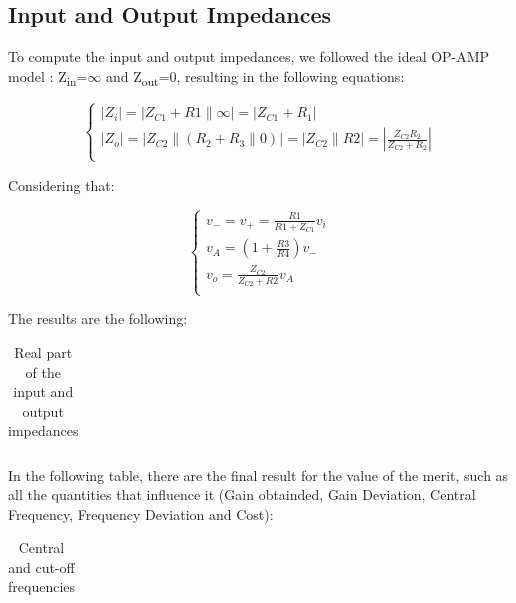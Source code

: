 \subsection{Input and Output Impedances}

To compute the input and output impedances, we followed the ideal OP-AMP model : Z\textsubscript{in}=$\infty$ and Z\textsubscript{out}=0, resulting in the following equations:

\begin{equation}\label{impedances}
\begin{cases}
  |Z_i| = |Z_{C1} + R1 \parallel \infty| = |Z_{C1} + R_1|\\
  |Z_o| = |Z_{C2} \parallel (R_2 + R_3 \parallel 0)| = |Z_{C2} \parallel R2| 
  = |\frac{Z_{C2}R_2}{Z_{C2}+R_2}|\\
 \end{cases}
\end{equation}


 Considering that:
 
 \begin{equation}
 \begin{cases}
    v_- = v_+ = \frac{R1}{R1+Z_{C1}} v_i\\
    v_A = \left(1 + \frac{R3}{R4}\right) v_-\\
    v_o = \frac{Z_{C2}}{Z_{C2}+R2} v_A\\
  \end{cases}
 \end{equation}
 
 
The results are the following:

\begin{table}[!htb]
\centering
  \begin{tabular}{|c|c|}
    \hline    
    
 \end{tabular}
 \caption{Real part of the input and output impedances}\label{tab:theo:impedances}
\end{table}

In the following table, there are the final result for the value of the merit, such as all the quantities that influence it (Gain obtainded, Gain Deviation, Central Frequency, Frequency Deviation and Cost):


\begin{table}[!htb]
\centering
  \begin{tabular}{|c | c|}
    \hline    
    
 \end{tabular}
 \caption{Central and cut-off frequencies}\label{tab:theo:frequencies}
\end{table}



